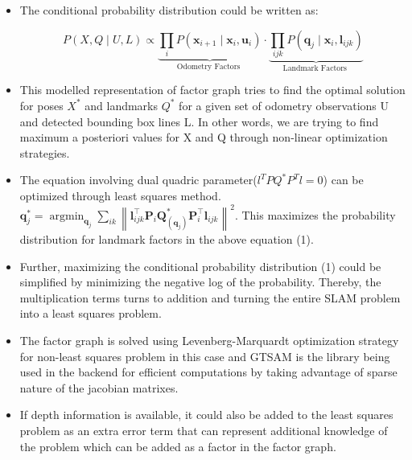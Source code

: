 \documentclass{article}
\begin{document}
\begin{itemize}
\item The conditional probability distribution could be written as:
  
\begin{equation}
{
P(X, Q \mid U, L) \propto \underbrace{\prod_{i} P\left(\mathbf{x}_{i+1} \mid \mathbf{x}_{i}, \mathbf{u}_{i}\right)}_{\text {Odometry Factors }} \cdot \underbrace{\prod_{i j k} P\left(\mathbf{q}_{j} \mid \mathbf{x}_{i}, \mathbf{l}_{i j k}\right)}_{\text {Landmark Factors }}
}
\end{equation}

\item This modelled representation of factor graph tries to find the optimal solution for poses $X^{*}$ and landmarks $Q^{*}$ for a given set of odometry observations U and detected bounding box lines L. In other words, we are trying to find maximum a posteriori values for X and Q through non-linear optimization strategies.

\item The equation involving dual quadric parameter($l^{T} P Q^{*} P^{T} l = 0$) can be optimized through least squares method. $\mathbf{q}_{j}^{*}=\operatorname{argmin}_{\mathbf{q}_{j}} \sum_{i k}\left\|\mathbf{l}_{i j k}^{\top} \mathbf{P}_{i} \mathbf{Q}_{\left(\mathbf{q}_{j}\right)}^{*} \mathbf{P}_{i}^{\top} \mathbf{l}_{i j k}\right\|^{2}$. This maximizes the probability distribution for landmark factors in the above equation (1).

\item Further, maximizing the conditional probability distribution (1) could be simplified by minimizing the negative log of the probability. Thereby, the multiplication terms turns to addition and turning the entire SLAM problem into a least squares problem.

\item The factor graph is solved using Levenberg-Marquardt optimization strategy for non-least squares problem in this case and GTSAM\cite{gtsam} is the library being used in the backend for efficient computations by taking advantage of sparse nature of the jacobian matrixes.

\item If depth information is available, it could also be added to the least squares problem as an extra error term that can represent additional knowledge of the problem which can be added as a factor in the factor graph.


\end{itemize}
\end{document}
